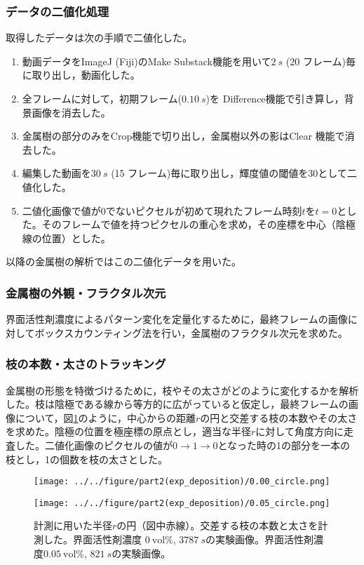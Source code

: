 \documentclass[autodetect-engine,dvi=dvipdfmx,a4paper,ja=standard,oneside,openany,11pt]{bxjsbook}
\begin{document}
\subsubsection{データの二値化処理}
取得したデータは次の手順で二値化した。
\begin{enumerate}
  \item 動画データをImageJ (Fiji)のMake Substack機能を用いて$\SI{2}{s}$ (20 フレーム)毎に取り出し，動画化した。
  \item 全フレームに対して，初期フレーム($\SI{0.10}{s}$)を Difference機能で引き算し，背景画像を消去した。
  \item 金属樹の部分のみをCrop機能で切り出し，金属樹以外の影はClear 機能で消去した。
  \item 編集した動画を$\SI{30}{s}$ (15 フレーム)毎に取り出し，輝度値の閾値を30として二値化した。
  \item 二値化画像で値が0でないピクセルが初めて現れたフレーム時刻$t$を$t=0$とした。そのフレームで値を持つピクセルの重心を求め，その座標を中心（陰極線の位置）とした。
\end{enumerate}
以降の金属樹の解析ではこの二値化データを用いた。
\subsubsection{金属樹の外観・フラクタル次元}
界面活性剤濃度によるパターン変化を定量化するために，最終フレームの画像に対してボックスカウンティング法を行い，金属樹のフラクタル次元を求めた。
\subsubsection{枝の本数・太さのトラッキング}
金属樹の形態を特徴づけるために，枝やその太さがどのように変化するかを解析した。枝は陰極である線から等方的に広がっていると仮定し，最終フレームの画像について，図\ref{fig:circle}のように，中心からの距離$r$の円と交差する枝の本数やその太さを求めた。陰極の位置を極座標の原点とし，適当な半径$r$に対して角度方向に走査した。二値化画像のピクセルの値が$0\rightarrow1\rightarrow0$となった時の1の部分を一本の枝とし，1の個数を枝の太さとした。

\begin{figure}[htbp]
  \begin{minipage}
    {0.5\textwidth}
    \subcaption{}
    \centering
    \texttt{[image: ../../figure/part2(exp\_deposition)/0.00\_circle.png]}
    \label{fig:0.00_circle}
  \end{minipage}
  \begin{minipage}
    {0.5\textwidth}
    \subcaption{}
    \centering
    \texttt{[image: ../../figure/part2(exp\_deposition)/0.05\_circle.png]}
    \label{fig:0.05_circle}
  \end{minipage}
  \caption{計測に用いた半径$r$の円（図中赤線）。交差する枝の本数と太さを計測した。界面活性剤濃度 $\SI{0}{\mathrm{vol}\%}$, $\SI{3787}{s}$の実験画像。界面活性剤濃度$\SI{0.05}{\mathrm{vol}\%}$, $\SI{821}{s}$の実験画像。}
  \label{fig:circle}
\end{figure}
\end{document}
